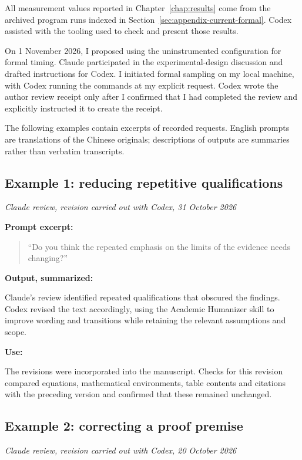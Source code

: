 All measurement values reported in Chapter~\ref{chap:results} come from the
archived program runs indexed in Section~\ref{sec:appendix-current-formal}.
Codex assisted with the tooling used to check and present those results.

On 1 November 2026, I proposed using the uninstrumented configuration for
formal timing. Claude participated in the experimental-design discussion and
drafted instructions for Codex. I initiated formal sampling on my local
machine, with Codex running the commands at my explicit request. Codex wrote
the author review receipt only after I confirmed that I had completed the
review and explicitly instructed it to create the receipt.

The following examples contain excerpts of recorded requests. English prompts
are translations of the Chinese originals; descriptions of outputs are summaries
rather than verbatim transcripts.

\subsection*{Example 1: reducing repetitive qualifications}
\textit{Claude review, revision carried out with Codex, 31 October 2026}

\textbf{Prompt excerpt:}
\begin{quote}
\enquote{Do you think the repeated emphasis on the limits of the evidence needs changing?}
\end{quote}

\textbf{Output, summarized:}

Claude's review identified repeated qualifications that obscured the findings.
Codex revised the text accordingly, using the Academic Humanizer skill to
improve wording and transitions while retaining the relevant assumptions and
scope.

\textbf{Use:}\par\nopagebreak[4]

The revisions were incorporated into the manuscript. Checks for this revision
compared equations, mathematical environments, table contents and citations with
the preceding version and confirmed that these remained unchanged.

\subsection*{Example 2: correcting a proof premise}
\textit{Claude review, revision carried out with Codex, 20 October 2026}

